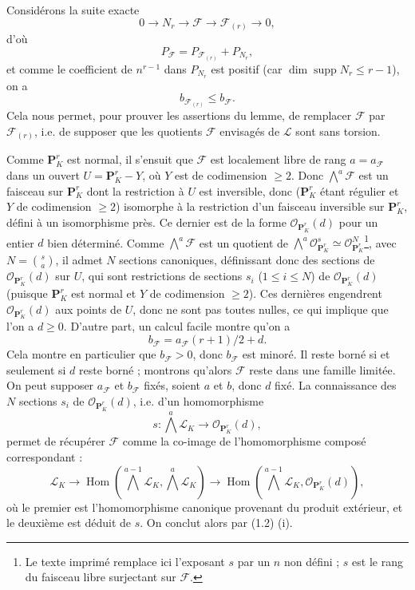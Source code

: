 Considérons la suite exacte
\[
0\longrightarrow N_r\longrightarrow\mathcal F
\longrightarrow\mathcal F_{(r)}\longrightarrow0,
\]
d'où
\[
P_{\mathcal F}=P_{\mathcal F_{(r)}}+P_{N_r},
\]
et comme le coefficient de $n^{r-1}$ dans $P_{N_r}$ est positif (car
$\dim\operatorname{supp}N_r\leq r-1$), on a
\[
b_{\mathcal F_{(r)}}\leq b_{\mathcal F}.
\]
Cela nous permet, pour prouver les assertions du lemme, de remplacer
$\mathcal F$ par $\mathcal F_{(r)}$, i.e. de supposer que les quotients
$\mathcal F$ envisagés de $\mathcal L$ sont sans torsion.

Comme $\mathbf P^r_K$ est normal, il s'ensuit que $\mathcal F$ est localement
libre de rang $a=a_{\mathcal F}$ dans un ouvert
$U=\mathbf P^r_K-Y$, où $Y$ est de codimension $\geq2$. Donc
$\bigwedge^a\mathcal F$ est un faisceau sur $\mathbf P^r_K$ dont la restriction
à $U$ est inversible, donc ($\mathbf P^r_K$ étant régulier et $Y$ de
codimension $\geq2$) isomorphe à la restriction d'un faisceau inversible sur
$\mathbf P^r_K$, défini à un isomorphisme près. Ce dernier est de la forme
$\mathcal O_{\mathbf P^r_K}(d)$ pour un entier $d$ bien déterminé. Comme
$\bigwedge^a\mathcal F$ est un quotient de
$\bigwedge^a\mathcal O_{\mathbf P^r_K}^{s}\simeq
\mathcal O_{\mathbf P^r_K}^{N}$\footnote{Le texte imprimé remplace ici
l'exposant $s$ par un $n$ non défini ; $s$ est le rang du faisceau libre
surjectant sur $\mathcal F$.}, avec $N=\binom{s}{a}$, il admet $N$ sections
canoniques, définissant donc des sections de
$\mathcal O_{\mathbf P^r_K}(d)$ sur $U$, qui sont restrictions de sections
$s_i$ ($1\leq i\leq N$) de $\mathcal O_{\mathbf P^r_K}(d)$ (puisque
$\mathbf P^r_K$ est normal et $Y$ de codimension $\geq2$). Ces dernières
engendrent $\mathcal O_{\mathbf P^r_K}(d)$ aux points de $U$, donc ne sont pas
toutes nulles, ce qui implique que l'on a $d\geq0$. D'autre part, un calcul
facile montre qu'on a
\[
b_{\mathcal F}=a_{\mathcal F}(r+1)/2+d.
\]
Cela montre en particulier que $b_{\mathcal F}>0$, donc $b_{\mathcal F}$ est
minoré. Il reste borné si et seulement si $d$ reste borné ; montrons qu'alors
$\mathcal F$ reste dans une famille limitée. On peut supposer
$a_{\mathcal F}$ et $b_{\mathcal F}$ fixés, soient $a$ et $b$, donc $d$ fixé.
La connaissance des $N$ sections $s_i$ de $\mathcal O_{\mathbf P^r_K}(d)$,
i.e. d'un homomorphisme
\[
s:\bigwedge^a\mathcal L_K\longrightarrow\mathcal O_{\mathbf P^r_K}(d),
\]
permet de récupérer $\mathcal F$ comme la co-image de l'homomorphisme composé
correspondant :
\[
\mathcal L_K\longrightarrow
\operatorname{Hom}\!\left(\bigwedge^{a-1}\mathcal L_K,
\bigwedge^a\mathcal L_K\right)\longrightarrow
\operatorname{Hom}\!\left(\bigwedge^{a-1}\mathcal L_K,
\mathcal O_{\mathbf P^r_K}(d)\right),
\]
où le premier est l'homomorphisme canonique provenant du produit extérieur, et
le deuxième est déduit de $s$. On conclut alors par (1.2) (i).

